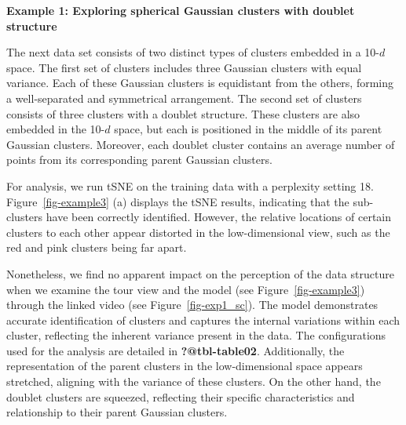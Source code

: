 \documentclass[
  12pt]{article}
\begin{document}
\textbf{Example 1: Exploring spherical Gaussian clusters with doublet
structure}

The next data set consists of two distinct types of clusters embedded in
a 10-\(d\) space. The first set of clusters includes three Gaussian
clusters with equal variance. Each of these Gaussian clusters is
equidistant from the others, forming a well-separated and symmetrical
arrangement. The second set of clusters consists of three clusters with
a doublet structure. These clusters are also embedded in the 10-\(d\)
space, but each is positioned in the middle of its parent Gaussian
clusters. Moreover, each doublet cluster contains an average number of
points from its corresponding parent Gaussian clusters.

For analysis, we run tSNE on the training data with a perplexity setting
18. Figure~\ref{fig-example3} (a) displays the tSNE results, indicating
that the sub-clusters have been correctly identified. However, the
relative locations of certain clusters to each other appear distorted in
the low-dimensional view, such as the red and pink clusters being far
apart.

Nonetheless, we find no apparent impact on the perception of the data
structure when we examine the tour view and the model (see
Figure~\ref{fig-example3}) through the linked video (see
Figure~\ref{fig-exp1_sc}). The model demonstrates accurate
identification of clusters and captures the internal variations within
each cluster, reflecting the inherent variance present in the data. The
configurations used for the analysis are detailed in
\textbf{?@tbl-table02}. Additionally, the representation of the parent
clusters in the low-dimensional space appears stretched, aligning with
the variance of these clusters. On the other hand, the doublet clusters
are squeezed, reflecting their specific characteristics and relationship
to their parent Gaussian clusters.
\end{document}
